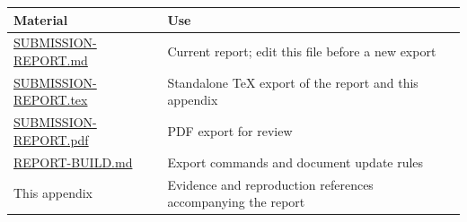 \documentclass[10pt,a4paper]{article}
\begin{document}
\begin{longtable}[]{@{}ll@{}}
\toprule
\begin{minipage}[b]{0.47\columnwidth}\raggedright
Material\strut
\end{minipage} & \begin{minipage}[b]{0.47\columnwidth}\raggedright
Use\strut
\end{minipage}\tabularnewline
\midrule
\endhead
\begin{minipage}[t]{0.47\columnwidth}\raggedright
\href{https://github.com/MoyaMryia/riscv-accl/blob/main/spacemit/reports/SUBMISSION-REPORT.md}{SUBMISSION-REPORT.md}\strut
\end{minipage} & \begin{minipage}[t]{0.47\columnwidth}\raggedright
Current report; edit this file before a new export\strut
\end{minipage}\tabularnewline
\begin{minipage}[t]{0.47\columnwidth}\raggedright
\href{https://github.com/MoyaMryia/riscv-accl/blob/main/spacemit/reports/SUBMISSION-REPORT.tex}{SUBMISSION-REPORT.tex}\strut
\end{minipage} & \begin{minipage}[t]{0.47\columnwidth}\raggedright
Standalone TeX export of the report and this appendix\strut
\end{minipage}\tabularnewline
\begin{minipage}[t]{0.47\columnwidth}\raggedright
\href{https://github.com/MoyaMryia/riscv-accl/blob/main/spacemit/reports/SUBMISSION-REPORT.pdf}{SUBMISSION-REPORT.pdf}\strut
\end{minipage} & \begin{minipage}[t]{0.47\columnwidth}\raggedright
PDF export for review\strut
\end{minipage}\tabularnewline
\begin{minipage}[t]{0.47\columnwidth}\raggedright
\href{https://github.com/MoyaMryia/riscv-accl/blob/main/spacemit/reports/REPORT-BUILD.md}{REPORT-BUILD.md}\strut
\end{minipage} & \begin{minipage}[t]{0.47\columnwidth}\raggedright
Export commands and document update rules\strut
\end{minipage}\tabularnewline
\begin{minipage}[t]{0.47\columnwidth}\raggedright
This appendix\strut
\end{minipage} & \begin{minipage}[t]{0.47\columnwidth}\raggedright
Evidence and reproduction references accompanying the report\strut

\end{minipage}
\end{longtable}
\end{document}
